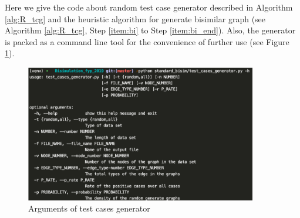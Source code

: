 Here we give the code about random test case generator described in Algorithm \ref{alg:R_tcg} and the heuristic algorithm for generate bisimilar graph (see Algorithm \ref{alg:R_tcg}, Step \ref{item:bi} to Step \ref{item:bi_end}).
Also, the generator is packed as a command line tool for the convenience of further use (see Figure \ref{fig:arggenerator}).
\begin{figure}[h]
    \centering
    \includegraphics[width=0.9\textwidth]{img/generator.png}
    \caption{Arguments of test cases generator}
    \label{fig:arggenerator}
\end{figure}


